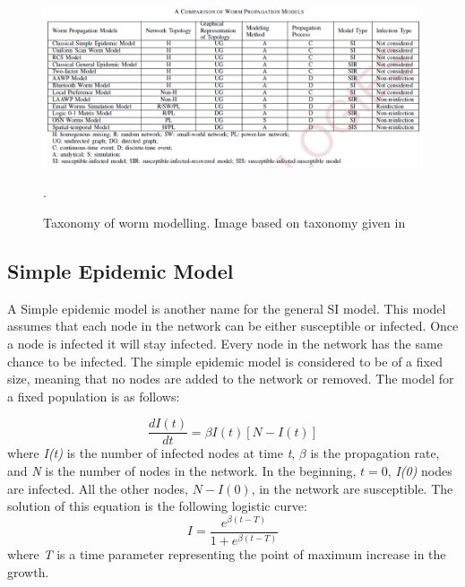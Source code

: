 

\begin{figure}
\centering
\includegraphics[scale=0.55]{Images/tableworms.png}
\caption{Taxonomy of worm modelling. Image based on taxonomy given in \cite{wang2014modeling}}.
\label{tree}
\end{figure}


\subsection{Simple Epidemic Model}
A Simple epidemic model is another name for the general SI model. This model assumes that each node in the network can be either susceptible or infected. 
Once a node is infected it will stay infected. Every node in the network has the same chance to be infected. 
The simple epidemic model is considered to be of a fixed size, meaning that no nodes are added to the network or removed. The model for a fixed population is as follows:

\begin{equation}
\dfrac{d I(t)}{dt} = \beta I(t)[N-I(t)]
\end{equation} 
where \textit{I(t)} is the number of infected nodes at time \textit{t}, $\beta$ is the propagation rate, and \textit{N} is the number of nodes in the network. In the beginning, $t=0$, \textit{I(0)} nodes are infected. All the other nodes, $N - I(0)$, in the network are susceptible. 
The solution of this equation is the following logistic curve:
\begin{equation}
I = \dfrac{e^{\beta(t-T)}}{1+e^{\beta(t-T)}}
\label{SIdelay}
\end{equation}
where \textit{T} is a time parameter representing the point of maximum increase in the growth.\\

